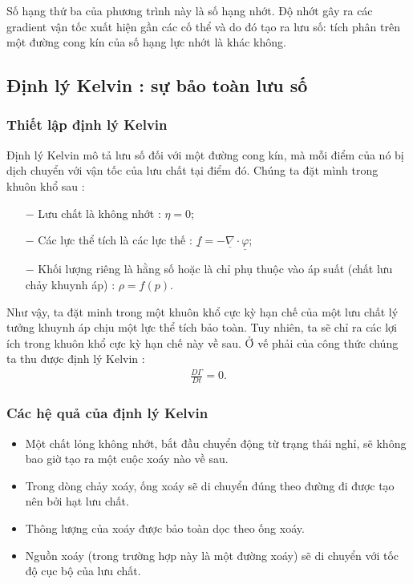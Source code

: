 \documentclass[CO_LUU_CHAT.tex]{subfiles}
\begin{document}
	Số hạng thứ ba của phương trình này là số hạng nhớt. Độ nhớt gây ra các gradient vận tốc xuất hiện gần các cố thể và do đó tạo ra lưu số: tích phân trên một đường cong kín của số hạng lực nhớt là khác không.


\subsection{Định lý Kelvin : sự bảo toàn lưu số}
\subsubsection{Thiết lập định lý Kelvin}

	Định lý Kelvin mô tả lưu số đối với một đường cong kín, mà mỗi điểm của nó bị dịch chuyển với vận tốc của lưu chất tại điểm đó. Chúng ta đặt mình trong khuôn khổ sau :
	\begin{itemize}
		\item[$-$] Lưu chất là không nhớt : $\eta=0$;
		\item[$-$] Các lực thể tích là các lực thế : $\underline{f}=-\underline{\nabla}\cdot\underline{\varphi}$;
		\item[$-$] Khối lượng riêng là hằng số hoặc là chỉ phụ thuộc vào áp suất (chất lưu chảy khuynh áp) : $\rho=f(p)$.
	\end{itemize}

	Như vậy, ta đặt minh trong một khuôn khổ cực kỳ hạn chế của một lưu chất lý tưởng khuynh áp chịu một lực thể tích bảo toàn. Tuy nhiên, ta sẽ chỉ ra các lợi ích trong khuôn khổ cực kỳ hạn chế này về sau. Ở vế phải của công thức chúng ta thu được định lý Kelvin :
		\begin{equation}
			\begin{aligned}
				\boxed{
					\frac{D\Gamma}{Dt}=0
				}.
			\end{aligned}
		\end{equation}

\subsubsection{Các hệ quả của định lý Kelvin}
	\begin{itemize}
		\item Một chất lỏng không nhớt, bắt đầu chuyển động từ trạng thái nghỉ, sẽ không bao giờ tạo ra một cuộc xoáy nào về sau.
		\item Trong dòng chảy xoáy, ống xoáy sẽ di chuyển đúng theo đường đi được tạo nên bởi hạt lưu chất.
		\item Thông lượng của xoáy được bảo toàn dọc theo ống xoáy.
		\item Nguồn xoáy (trong trường hợp này là một đường xoáy) sẽ di chuyển với tốc độ cục bộ của lưu chất.
	\end{itemize}
\end{document}
